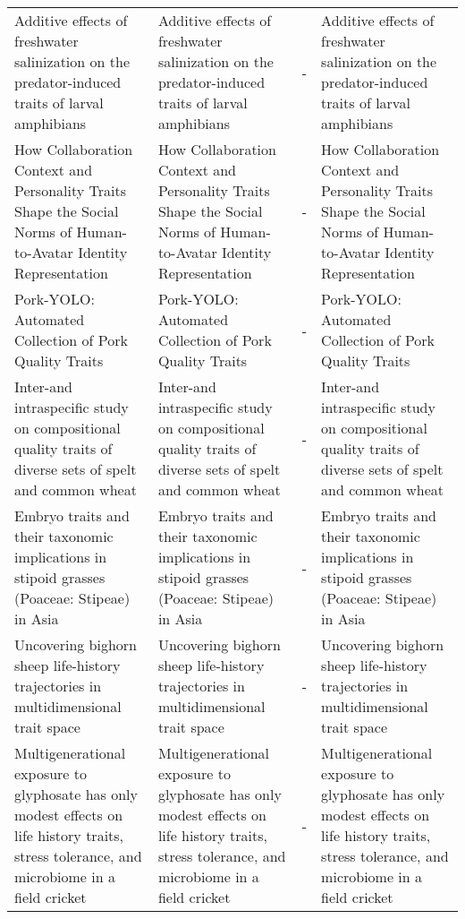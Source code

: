 \begin{table}[h!]
\begin{sideways}
\begin{tabularx}{\textwidth}{|X|X|p{1cm}|X|}
        Additive effects of freshwater salinization on the predator-induced traits of larval amphibians & Additive effects of freshwater salinization on the predator-induced traits of larval amphibians & - & Additive effects of freshwater salinization on the predator-induced traits of larval amphibians\\
        How Collaboration Context and Personality Traits Shape the Social Norms of Human-to-Avatar Identity Representation & How Collaboration Context and Personality Traits Shape the Social Norms of Human-to-Avatar Identity Representation & - & How Collaboration Context and Personality Traits Shape the Social Norms of Human-to-Avatar Identity Representation\\
        Pork-YOLO: Automated Collection of Pork Quality Traits & Pork-YOLO: Automated Collection of Pork Quality Traits & - & Pork-YOLO: Automated Collection of Pork Quality Traits\\
        Inter-and intraspecific study on compositional quality traits of diverse sets of spelt and common wheat & Inter-and intraspecific study on compositional quality traits of diverse sets of spelt and common wheat & - & Inter-and intraspecific study on compositional quality traits of diverse sets of spelt and common wheat\\
        Embryo traits and their taxonomic implications in stipoid grasses (Poaceae: Stipeae) in Asia & Embryo traits and their taxonomic implications in stipoid grasses (Poaceae: Stipeae) in Asia & - & Embryo traits and their taxonomic implications in stipoid grasses (Poaceae: Stipeae) in Asia\\
        Uncovering bighorn sheep life-history trajectories in multidimensional trait space & Uncovering bighorn sheep life-history trajectories in multidimensional trait space & - & Uncovering bighorn sheep life-history trajectories in multidimensional trait space\\
        Multigenerational exposure to glyphosate has only modest effects on life history traits, stress tolerance, and microbiome in a field cricket & Multigenerational exposure to glyphosate has only modest effects on life history traits, stress tolerance, and microbiome in a field cricket & - & Multigenerational exposure to glyphosate has only modest effects on life history traits, stress tolerance, and microbiome in a field cricket\\
        \hline
    \end{tabularx}
\end{sideways}
    \label{table:llmTitel}
\end{table}
